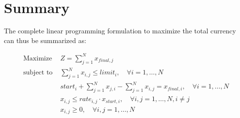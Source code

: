 \documentclass{article}
\begin{document}
\section*{Summary}
The complete linear programming formulation to maximize the total currency can thus be summarized as:

\[
\begin{align*}
\text{Maximize } & Z = \sum_{j=1}^{N} x_{final,j} \\
\text{subject to } & \sum_{j=1}^{N} x_{i,j} \leq limit_i, \quad \forall i = 1, \ldots, N \\
& start_i + \sum_{j=1}^{N} x_{j,i} - \sum_{j=1}^{N} x_{i,j} = x_{final,i}, \quad \forall i = 1, \ldots, N \\
& x_{i,j} \leq rate_{i,j} \cdot x_{start,i}, \quad \forall i,j = 1, \ldots, N, i \neq j \\
& x_{i,j} \geq 0, \quad \forall i,j = 1, \ldots, N
\end{align*}
\]
\end{document}
